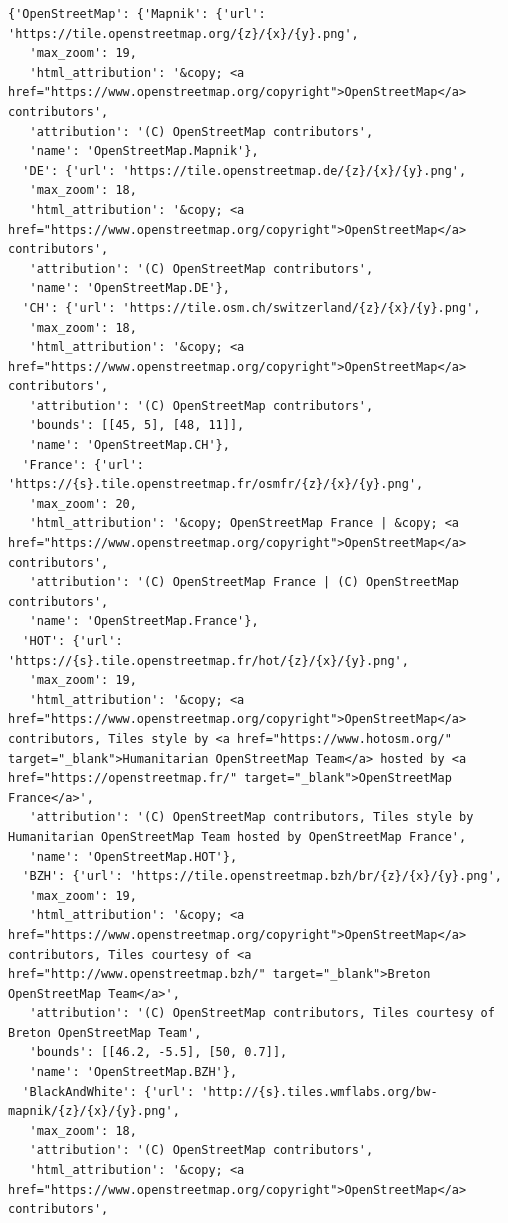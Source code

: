 \documentclass[
  letterpaper,
  DIV=11,
  numbers=noendperiod]{scrreprt}
\begin{document}
\begin{verbatim}
{'OpenStreetMap': {'Mapnik': {'url': 'https://tile.openstreetmap.org/{z}/{x}/{y}.png',
   'max_zoom': 19,
   'html_attribution': '&copy; <a href="https://www.openstreetmap.org/copyright">OpenStreetMap</a> contributors',
   'attribution': '(C) OpenStreetMap contributors',
   'name': 'OpenStreetMap.Mapnik'},
  'DE': {'url': 'https://tile.openstreetmap.de/{z}/{x}/{y}.png',
   'max_zoom': 18,
   'html_attribution': '&copy; <a href="https://www.openstreetmap.org/copyright">OpenStreetMap</a> contributors',
   'attribution': '(C) OpenStreetMap contributors',
   'name': 'OpenStreetMap.DE'},
  'CH': {'url': 'https://tile.osm.ch/switzerland/{z}/{x}/{y}.png',
   'max_zoom': 18,
   'html_attribution': '&copy; <a href="https://www.openstreetmap.org/copyright">OpenStreetMap</a> contributors',
   'attribution': '(C) OpenStreetMap contributors',
   'bounds': [[45, 5], [48, 11]],
   'name': 'OpenStreetMap.CH'},
  'France': {'url': 'https://{s}.tile.openstreetmap.fr/osmfr/{z}/{x}/{y}.png',
   'max_zoom': 20,
   'html_attribution': '&copy; OpenStreetMap France | &copy; <a href="https://www.openstreetmap.org/copyright">OpenStreetMap</a> contributors',
   'attribution': '(C) OpenStreetMap France | (C) OpenStreetMap contributors',
   'name': 'OpenStreetMap.France'},
  'HOT': {'url': 'https://{s}.tile.openstreetmap.fr/hot/{z}/{x}/{y}.png',
   'max_zoom': 19,
   'html_attribution': '&copy; <a href="https://www.openstreetmap.org/copyright">OpenStreetMap</a> contributors, Tiles style by <a href="https://www.hotosm.org/" target="_blank">Humanitarian OpenStreetMap Team</a> hosted by <a href="https://openstreetmap.fr/" target="_blank">OpenStreetMap France</a>',
   'attribution': '(C) OpenStreetMap contributors, Tiles style by Humanitarian OpenStreetMap Team hosted by OpenStreetMap France',
   'name': 'OpenStreetMap.HOT'},
  'BZH': {'url': 'https://tile.openstreetmap.bzh/br/{z}/{x}/{y}.png',
   'max_zoom': 19,
   'html_attribution': '&copy; <a href="https://www.openstreetmap.org/copyright">OpenStreetMap</a> contributors, Tiles courtesy of <a href="http://www.openstreetmap.bzh/" target="_blank">Breton OpenStreetMap Team</a>',
   'attribution': '(C) OpenStreetMap contributors, Tiles courtesy of Breton OpenStreetMap Team',
   'bounds': [[46.2, -5.5], [50, 0.7]],
   'name': 'OpenStreetMap.BZH'},
  'BlackAndWhite': {'url': 'http://{s}.tiles.wmflabs.org/bw-mapnik/{z}/{x}/{y}.png',
   'max_zoom': 18,
   'attribution': '(C) OpenStreetMap contributors',
   'html_attribution': '&copy; <a href="https://www.openstreetmap.org/copyright">OpenStreetMap</a> contributors',

\end{verbatim}
\end{document}
